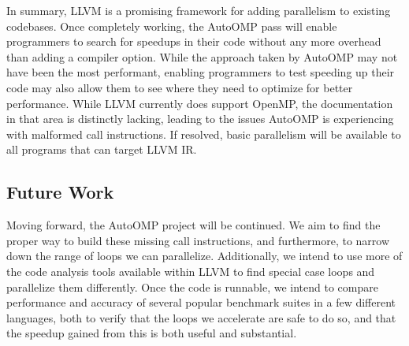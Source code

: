 \documentclass[conference]{IEEEtran}
\begin{document}
In summary, LLVM is a promising framework for adding parallelism to existing codebases.
Once completely working, the AutoOMP pass will enable programmers to search for speedups
in their code without any more overhead than adding a compiler option. While the approach
taken by AutoOMP may not have been the most performant, enabling programmers to test speeding
up their code may also allow them to see where they need to optimize for better performance.
While LLVM currently does support OpenMP, the documentation in that area is distinctly lacking,
leading to the issues AutoOMP is experiencing with malformed call instructions. If resolved,
basic parallelism will be available to all programs that can target LLVM IR.


\subsection{Future Work}


Moving forward, the AutoOMP project will be continued. We aim to find the proper way to build these
missing call instructions, and furthermore, to narrow down the range of loops we can parallelize.
Additionally, we intend to use more of the code analysis tools available within LLVM to find
special case loops and parallelize them differently.
Once the code is runnable, we intend to compare performance and accuracy of several popular benchmark suites
in a few different languages, both to verify that the loops we accelerate are safe to do so, and that
the speedup gained from this is both useful and substantial.
%
%
\end{document}
